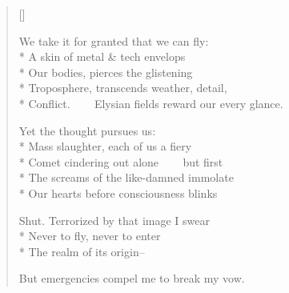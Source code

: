\label{ch:precipitous_flight}
\settowidth{\versewidth}{Conflict.     Elysian fields reward our every glance.}
\begin{verse}[\versewidth]

We take it for granted that we can fly:\\*
A skin of metal \& tech envelops\\*
Our bodies, pierces the glistening\\*
Troposphere, transcends weather, detail,\\*
Conflict.     Elysian fields reward our every glance.

Yet the thought pursues us:\\*
Mass slaughter, each of us a fiery\\*
Comet cindering out alone     but first\\*
The screams of the like-damned immolate\\*
Our hearts before consciousness blinks

Shut. Terrorized by that image I swear\\*
Never to fly, never to enter\\*
The realm of its origin--

But emergencies compel me to break my vow.
\end{verse}
